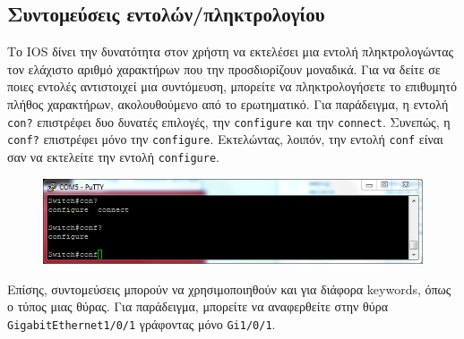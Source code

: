 \documentclass[12pt]{article}
\begin{document}
\subsection{Συντομεύσεις εντολών/πληκτρολογίου}
Το IOS δίνει την δυνατότητα στον χρήστη να εκτελέσει μια εντολή πληκτρολογώντας τον ελάχιστο αριθμό χαρακτήρων που την προσδιορίζουν μοναδικά. Για να δείτε σε ποιες εντολές αντιστοιχεί μια συντόμευση, μπορείτε να πληκτρολογήσετε το επιθυμητό πλήθος χαρακτήρων, ακολουθούμενο από το ερωτηματικό.
Για παράδειγμα, η εντολή \texttt{con?} επιστρέφει δυο δυνατές επιλογές, την \texttt{configure} και την \texttt{connect}. Συνεπώς, η \texttt{conf?} επιστρέφει μόνο την \texttt{configure}. Εκτελώντας, λοιπόν, την εντολή \texttt{conf} είναι σαν να εκτελείτε την εντολή \texttt{configure}.

\begin{figure}[H]
	\centering
	\includegraphics[scale=.75]{conf}
\end{figure}
Επίσης, συντομεύσεις μπορούν να χρησιμοποιηθούν και για διάφορα keywords, όπως ο τύπος μιας θύρας. Για παράδειγμα, μπορείτε να αναφερθείτε στην θύρα \texttt{GigabitEthernet1/0/1} γράφοντας μόνο \texttt{Gi1/0/1}.\\
\end{document}
